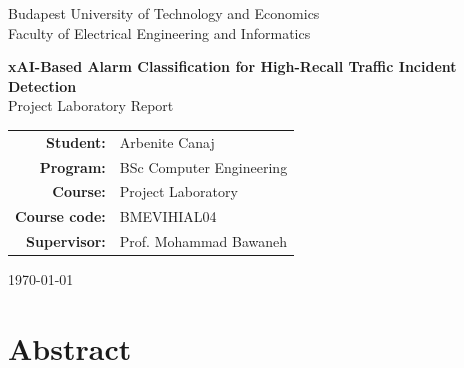 \documentclass[10pt,a4paper]{article}
\begin{document}
	
	\begin{titlepage}
		\centering
		\vspace*{1.6cm}
		
		{\Large Budapest University of Technology and Economics\\}
		{\large Faculty of Electrical Engineering and Informatics\\[1.2cm]}
		
		{\Huge \textbf{xAI-Based Alarm Classification for High-Recall Traffic Incident Detection
			}\\[0.4cm]}
		{\Large Project Laboratory Report\\[1.1cm]}
		
		\begin{tabular}{rl}
			\textbf{Student:}        & Arbenite Canaj \\
			\textbf{Program:}        & BSc Computer Engineering \\
			\textbf{Course:}         & Project Laboratory \\
			\textbf{Course code:}    & BMEVIHIAL04 \\
			\textbf{Supervisor:}     & Prof. Mohammad Bawaneh \\
		\end{tabular}
		
		\vfill
		{\large \today}
	\end{titlepage}
	
	\section*{Abstract}
	
\end{document}
